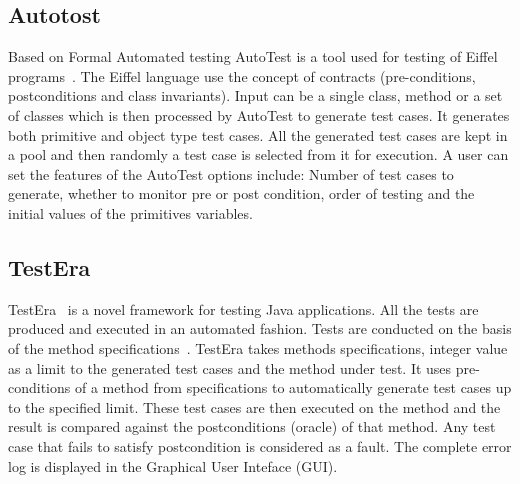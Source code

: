 
\subsection{Autotost}
Based on Formal Automated testing AutoTest is a tool used for testing of Eiffel programs~\cite{Ciupa2007}. The Eiffel language use the concept of contracts (pre-conditions, postconditions and class invariants). Input can be a single class, method or a set of classes which is then processed by AutoTest to generate test cases. It generates both primitive and object type test cases. All the generated test cases are kept in a pool and then randomly a test case is selected from it for execution. A user can set the features of the AutoTest options include: Number of test cases to generate, whether to monitor pre or post condition, order of testing and the initial values of the primitives variables.

\subsection{TestEra}
TestEra~\cite{Khurshid2004} is a novel framework for testing Java applications. All the tests are produced and executed in an automated fashion. Tests are conducted on the basis of the method specifications~\cite{Chang1999}. TestEra takes methods specifications, integer value as a limit to the generated test cases and the method under test. It uses pre-conditions of a method from specifications to automatically generate test cases up to the specified limit. These test cases are then executed on the method and the result is compared against the postconditions (oracle) of that method. Any test case that fails to satisfy postcondition is considered as a fault. The complete error log is displayed in the Graphical User Inteface (GUI).


